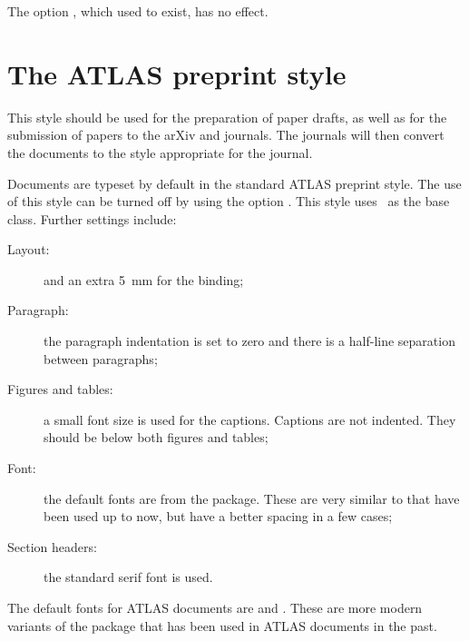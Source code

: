 The option , which used to exist, has no effect.


\section{The ATLAS preprint style}
\label{sec:atlasstyle}

This style should be used for the preparation of paper drafts,
as well as for the submission of papers to the arXiv and journals.
The journals will then convert the documents to the style appropriate for the journal.

Documents are typeset by default in the standard ATLAS preprint style.
The use of this style can be turned off by using the option
.
This style uses \KOMAScript\ as the base class.
Further settings include:
\begin{description}
\item[Layout:]  and an extra \SI{5}{\mm} for the binding;
\item[Paragraph:] the paragraph indentation is set to zero and 
  there is a half-line separation between paragraphs;
\item[Figures and tables:] a small font size is used for the captions.
  Captions are not indented.
  They should be below both figures and tables;
\item[Font:] the default fonts are from the  package.
  These are very similar to  that have been used up to now,
  but have a better spacing in a few cases;
\item[Section headers:] the standard serif font is used.
\end{description}

The default fonts for ATLAS documents are  and .
These are more modern variants of the package  that has been used in
ATLAS documents in the past.

